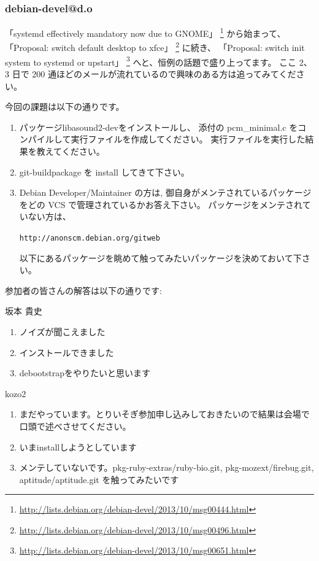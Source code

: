 \documentclass[mingoth,a4paper]{jsarticle}
\begin{document}
\subsubsection{debian-devel@d.o}

「systemd effectively mandatory now due to GNOME」
\footnote{\url{http://lists.debian.org/debian-devel/2013/10/msg00444.html}}
から始まって、
「Proposal: switch default desktop to xfce」
\footnote{\url{http://lists.debian.org/debian-devel/2013/10/msg00496.html}}
に続き、
「Proposal: switch init system to systemd or upstart」
\footnote{\url{http://lists.debian.org/debian-devel/2013/10/msg00651.html}}
へと、恒例の話題で盛り上ってます。
ここ 2、3 日で 200 通ほどのメールが流れているので興味のある方は追ってみてください。



今回の課題は以下の通りです。
\begin{screen}
  \begin{enumerate}
  \item %
    パッケージlibasound2-devをインストールし、
    添付の pcm\_minimal.c をコンパイルして実行ファイルを作成してください。
    実行ファイルを実行した結果を教えてください。
  \item %
    git-buildpackage を install してきて下さい。
  \item %
    Debian Developer/Maintainer の方は, 御自身がメンテされているパッケージをどの VCS で管理されているかお答え下さい。
    パッケージをメンテされていない方は、
    \begin{center}
      {\tt{http://anonscm.debian.org/gitweb}}
    \end{center}
    以下にあるパッケージを眺めて触ってみたいパッケージを決めておいて下さい。
  \end{enumerate}
\end{screen}

参加者の皆さんの解答は以下の通りです:

\begin{prework}{ 坂本 貴史 }
  \begin{enumerate}
  \item ノイズが聞こえました
  \item インストールできました
  \item debootstrapをやりたいと思います
  \end{enumerate}
\end{prework}

\begin{prework}{ kozo2 }
  \begin{enumerate}
  \item まだやっています。とりいそぎ参加申し込みしておきたいので結果は会場で口頭で述べさせてください。
  \item いまinstallしようとしています
  \item メンテしていないです。pkg-ruby-extras/ruby-bio.git, pkg-mozext/firebug.git, aptitude/aptitude.git を触ってみたいです
  \end{enumerate}
\end{prework}
\end{document}
